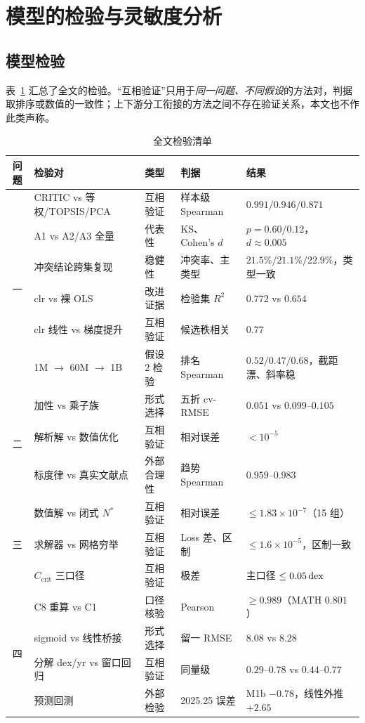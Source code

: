 \section{模型的检验与灵敏度分析}

\subsection{模型检验}

表~\ref{tab:checks} 汇总了全文的检验。“互相验证”只用于\emph{同一问题、不同假设}的方法对，判据取排序或数值的一致性；上下游分工衔接的方法之间不存在验证关系，本文也不作此类声称。

\begin{table}[!htbp]
\centering\small
\caption{全文检验清单}
\label{tab:checks}
\begin{tabular}{cp{4.3cm}p{2.2cm}p{2.8cm}p{4.3cm}}
\toprule
问题 & 检验对 & 类型 & 判据 & 结果 \\
\midrule
\multirow{6}{*}{一}
& CRITIC vs 等权/TOPSIS/PCA & 互相验证 & 样本级 Spearman & $0.991/0.946/0.871$ \\
& A1 vs A2/A3 全量 & 代表性 & KS、Cohen's $d$ & $p=0.60/0.12$，$d\approx0.005$ \\
& 冲突结论跨集复现 & 稳健性 & 冲突率、主类型 & $21.5\%/21.1\%/22.9\%$，类型一致 \\
& clr vs 裸 OLS & 改进证据 & 检验集 $R^2$ & $0.772$ vs $0.654$ \\
& clr 线性 vs 梯度提升 & 互相验证 & 候选秩相关 & $0.77$ \\
& 1M $\to$ 60M $\to$ 1B & 假设 2 检验 & 排名 Spearman & $0.52/0.47/0.68$，截距漂、斜率稳 \\
\midrule
\multirow{3}{*}{二}
& 加性 vs 乘子族 & 形式选择 & 五折 cv-RMSE & $0.051$ vs $0.099$–$0.105$ \\
& 解析解 vs 数值优化 & 互相验证 & 相对误差 & $<10^{-5}$ \\
& 标度律 vs 真实文献点 & 外部合理性 & 趋势 Spearman & $0.959$–$0.983$ \\
\midrule
\multirow{3}{*}{三}
& 数值解 vs 闭式 $N^*$ & 互相验证 & 相对误差 & $\le1.83\times10^{-7}$（15 组） \\
& 求解器 vs 网格穷举 & 互相验证 & Loss 差、区制 & $\le1.6\times10^{-5}$，区制一致 \\
& $C_{\mathrm{crit}}$ 三口径 & 互相验证 & 极差 & 主口径 $\le0.05\,\mathrm{dex}$ \\
\midrule
\multirow{4}{*}{四}
& C8 重算 vs C1 & 口径核验 & Pearson & $\ge0.989$（MATH $0.801$） \\
& sigmoid vs 线性桥接 & 形式选择 & 留一 RMSE & $8.08$ vs $8.28$ \\
& 分解 dex/yr vs 窗口回归 & 互相验证 & 同量级 & $0.29$–$0.78$ vs $0.44$–$0.77$ \\
& 预测回测 & 外部检验 & 2025.25 误差 & M1b $-0.78$，线性外推 $+2.65$ \\
\bottomrule
\end{tabular}
\end{table}

